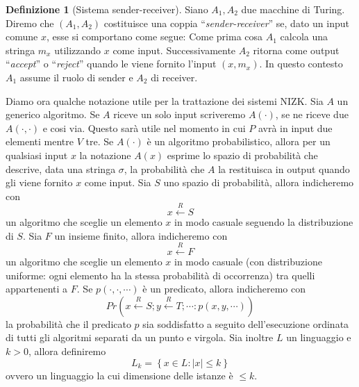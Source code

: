 \documentclass{article}
\theoremstyle{definition}
\newtheorem{definizione}{Definizione}
\begin{document}
\begin{definizione}[Sistema sender-receiver] Siano $A_1, A_2$ due macchine di Turing. Diremo che $(A_1, A_2)$ costituisce una coppia ``\emph{sender-receiver}'' se, dato un input comune $x$, esse si comportano come segue:
    Come prima cosa $A_1$ calcola una stringa $m_x$ utilizzando $x$ come input. Successivamente $A_2$ ritorna come output ``\emph{accept}'' o ``\emph{reject}'' quando le viene fornito l'input $(x, m_x)$. In questo contesto $A_1$ assume il ruolo di sender e $A_2$ di receiver.
\end{definizione}

Diamo ora qualche notazione utile per la trattazione dei sistemi NIZK.
Sia $A$ un generico algoritmo. Se $A$ riceve un solo input scriveremo $A(\cdot)$, se ne riceve due $A(\cdot, \cdot)$ e cosi via. Questo sarà utile nel momento in cui $P$ avrà in input due elementi mentre $V$ tre.
Se $A(\cdot)$ è un algoritmo probabilistico, allora per un qualsiasi input $x$ la notazione $A(x)$ esprime lo spazio di probabilità che descrive, data una stringa $\sigma$, la probabilità che $A$ la restituisca in output quando gli viene fornito $x$ come input.
Sia $S$ uno spazio di probabilità, allora indicheremo con
\begin{equation*}
    x \overset{R}{\leftarrow} S
\end{equation*}
un algoritmo che sceglie un elemento $x$ in modo casuale seguendo la distribuzione di $S$.
Sia $F$ un insieme finito, allora indicheremo con
\begin{equation*}
    x \overset{R}{\leftarrow} F
\end{equation*}
un algoritmo che sceglie un elemento $x$ in modo casuale (con distribuzione uniforme: ogni elemento ha la stessa probabilità di occorrenza) tra quelli appartenenti a $F$.
Se $p(\cdot, \cdot, \cdots)$ è un predicato, allora indicheremo con
\begin{equation*}
    Pr(x \overset{R}{\leftarrow} S; y \overset{R}{\leftarrow} T; \cdots : p(x, y, \cdots))
\end{equation*}
la probabilità che il predicato $p$ sia soddisfatto a seguito dell'esecuzione ordinata di tutti gli algoritmi separati da un punto e virgola.
Sia inoltre $L$ un linguaggio e $k>0$, allora definiremo 
\begin{equation*}
    L_k = \left\{ x \in L : |x| \leq k \right\}
\end{equation*}
ovvero un linguaggio la cui dimensione delle istanze è $\leq k$.
\end{document}
